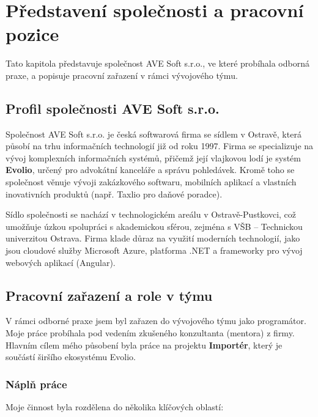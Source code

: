 \chapter{Představení společnosti a pracovní pozice}
\label{chap:company_profile}

Tato kapitola představuje společnost AVE Soft s.r.o., ve které probíhala odborná praxe, a popisuje pracovní zařazení v rámci vývojového týmu.

\section{Profil společnosti AVE Soft s.r.o.}

Společnost AVE Soft s.r.o. je česká softwarová firma se sídlem v Ostravě, která působí na trhu informačních technologií již od roku 1997. Firma se specializuje na vývoj komplexních informačních systémů, přičemž její vlajkovou lodí je systém \textbf{Evolio}, určený pro advokátní kanceláře a správu pohledávek. Kromě toho se společnost věnuje vývoji zakázkového softwaru, mobilních aplikací a vlastních inovativních produktů (např. Taxlio pro daňové poradce).

Sídlo společnosti se nachází v technologickém areálu v Ostravě-Pustkovci, což umožňuje úzkou spolupráci s akademickou sférou, zejména s VŠB – Technickou univerzitou Ostrava. Firma klade důraz na využití moderních technologií, jako jsou cloudové služby Microsoft Azure, platforma .NET \cite{dotnet_docs} a frameworky pro vývoj webových aplikací (Angular).

\section{Pracovní zařazení a role v týmu}

V rámci odborné praxe jsem byl zařazen do vývojového týmu jako programátor. Moje práce probíhala pod vedením zkušeného konzultanta (mentora) z firmy. Hlavním cílem mého působení byla práce na projektu \textbf{Importér}, který je součástí širšího ekosystému Evolio.

\subsection*{Náplň práce}
Moje činnost byla rozdělena do několika klíčových oblastí:


